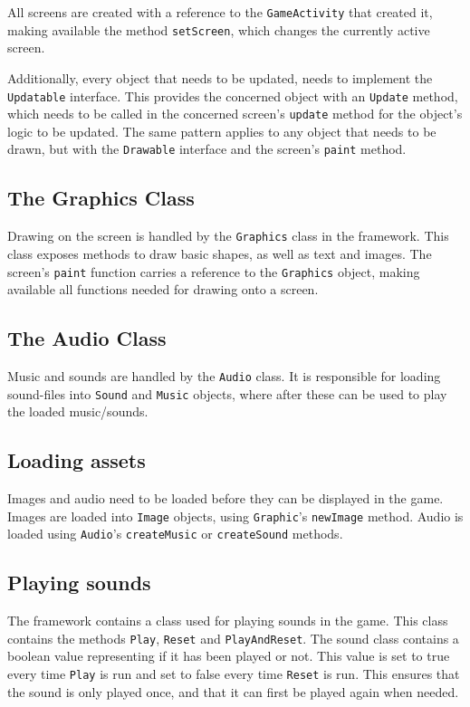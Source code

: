 All screens are created with a reference to the \lstinline|GameActivity| that created it, making available the method \lstinline|setScreen|, which changes the currently active screen.

Additionally, every object that needs to be updated, needs to implement the \lstinline|Updatable| interface.
This provides the concerned object with an \lstinline|Update| method, which needs to be called in the concerned screen's \lstinline|update| method for the object's logic to be updated.
The same pattern applies to any object that needs to be drawn, but with the \lstinline|Drawable| interface and the screen's \lstinline|paint| method.

\subsection{The Graphics Class}
Drawing on the screen is handled by the \lstinline|Graphics| class in the framework.
This class exposes methods to draw basic shapes, as well as text and images.
The screen's \lstinline|paint| function carries a reference to the \lstinline|Graphics| object, making available all functions needed for drawing onto a screen.

\subsection{The Audio Class}
Music and sounds are handled by the \lstinline|Audio| class.
It is responsible for loading sound-files into \lstinline|Sound| and \lstinline|Music| objects, where after these can be used to play the loaded music/sounds.

\subsection{Loading assets}
Images and audio need to be loaded before they can be displayed in the game.
Images are loaded into \lstinline|Image| objects, using \lstinline|Graphic|'s \lstinline|newImage| method.
Audio is loaded using \lstinline|Audio|'s \lstinline|createMusic| or \lstinline|createSound| methods.

\subsection{Playing sounds}
The framework contains a class used for playing sounds in the game. 
This class contains the methods \lstinline|Play|, \lstinline|Reset| and \lstinline|PlayAndReset|.
The sound class contains a boolean value representing if it has been played or not. 
This value is set to true every time \lstinline|Play| is run and set to false every time \lstinline|Reset| is run.
This ensures that the sound is only played once, and that it can first be played again when needed.

